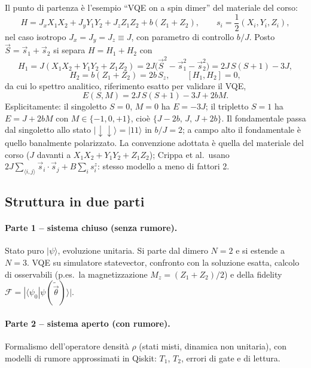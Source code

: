 \documentclass[11pt,a4paper]{article}
\begin{document}
Il punto di partenza \`e l'esempio ``VQE on a spin dimer'' del materiale del corso:
\begin{equation}
H = J_x X_1X_2 + J_y Y_1Y_2 + J_z Z_1Z_2 + b(Z_1+Z_2), \qquad s_i=\frac12(X_i,Y_i,Z_i),
\end{equation}
nel caso isotropo $J_x=J_y=J_z\equiv J$, con parametro di controllo $b/J$. Posto
$\vec S=\vec s_1+\vec s_2$ si separa $H=H_1+H_2$ con
\begin{equation}
H_1 = J(X_1X_2+Y_1Y_2+Z_1Z_2) = 2J\big(\vec S^2-\vec s_1^2-\vec s_2^2\big) = 2J\,S(S+1)-3J,
\end{equation}
\begin{equation}
H_2 = b(Z_1+Z_2) = 2b\,S_z, \qquad [H_1,H_2]=0,
\end{equation}
da cui lo spettro analitico, riferimento esatto per validare il VQE,
\begin{equation}
E(S,M) = 2J\,S(S+1) - 3J + 2bM.
\end{equation}
Esplicitamente: il singoletto $S=0$, $M=0$ ha $E=-3J$; il tripletto $S=1$ ha
$E=J+2bM$ con $M\in\{-1,0,+1\}$, cio\`e $\{J-2b,\,J,\,J+2b\}$. Il fondamentale passa dal
singoletto allo stato $|\!\downarrow\downarrow\rangle=|11\rangle$ in $b/J=2$; a campo
alto il fondamentale \`e quello banalmente polarizzato. La convenzione adottata \`e
quella del materiale del corso ($J$ davanti a $X_1X_2+Y_1Y_2+Z_1Z_2$); Crippa et al.\
usano $2J\sum_{\langle i,j\rangle}\vec s_i\cdot\vec s_j+B\sum_i s_i^z$: stesso modello a
meno di fattori 2.

\subsection{Struttura in due parti}

\paragraph{Parte 1 -- sistema chiuso (senza rumore).} Stato puro $|\psi\rangle$,
evoluzione unitaria. Si parte dal dimero $N=2$ e si estende a $N=3$. VQE su
simulatore statevector, confronto con la soluzione esatta, calcolo di osservabili
(p.es.\ la magnetizzazione $M_z=(Z_1+Z_2)/2$) e della fidelity
$\mathcal F=|\langle\psi_0|\psi(\tilde{\vec\theta})\rangle|$.

\paragraph{Parte 2 -- sistema aperto (con rumore).} Formalismo dell'operatore densit\`a
$\rho$ (stati misti, dinamica non unitaria), con modelli di rumore approssimati in
Qiskit: $T_1$, $T_2$, errori di gate e di lettura.
\end{document}
